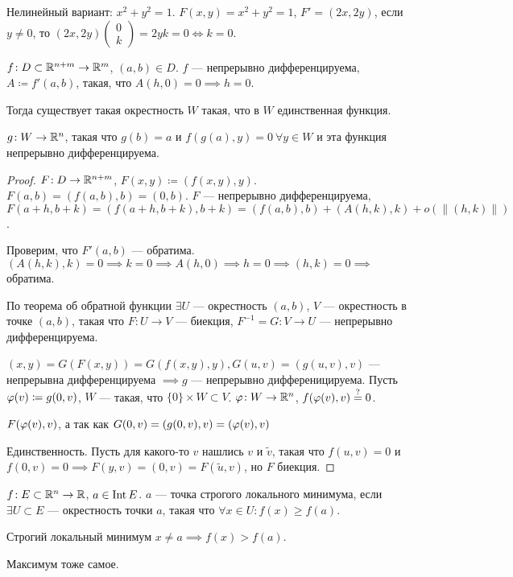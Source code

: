 Нелинейный вариант: $x^2 + y^2 = 1$.  $F(x, y) = x^2+y^2=1$,  $F'=(2x,2y)$, если  $y \neq 0$, то $(2x,2y) \begin{pmatrix} 0 \\ k \end{pmatrix}  = 2yk = 0 \iff k = 0$.
\begin{theorem}
    $f\!: D \subset \mathbb{R}^{n+m} \to \mathbb{R}^m$,  $(a, b) \in D$.  $f$ --- непрерывно дифференцируема,  $A \coloneqq f'(a, b)$, такая, что  $A(h, 0) = 0 \implies h = 0$.

    Тогда существует такая окрестность $W$ такая, что в  $W$ единственная функция.

     $g\!: W \to \mathbb{R}^n$, такая что  $g(b) = a$ и  $f(g(a), y) = 0\ \forall y \in W$ и эта функция непрерывно дифференцируема. 
\end{theorem}
\begin{proof}
    $F\!: D \to \mathbb{R}^{n+m}$,  $F(x, y) \coloneqq (f(x, y), y)$.  $F(a, b) = (f(a, b), b) = (0, b)$.  $F$ --- непрерывно дифференцируема,  $F(a+h, b+k) = (f(a+h, b+k), b+k) = (f(a, b), b) + (A(h, k), k) + o(\|(h, k)\|)$.

    Проверим, что $F'(a, b)$ --- обратима.  $(A(h, k), k) = 0 \implies k = 0 \implies A(h, 0) \implies h = 0 \implies (h, k) = 0 \implies$ обратима.

    По теорема об обратной функции  $\exists U$ --- окрестность  $(a, b)$,  $V$ --- окрестность в точке  $(a, b)$, такая что  $F\!: U \to V$ --- биекция,  $F^{-1} = G\!: V \to U$ --- непрерывно дифференцируема.

    $(x, y) = G(F(x, y)) = G(f(x, y), y), G(u, v) = (g(u, v), v)$ --- непрерывна дифференцируема $\implies g$ --- непрерывно дифференицируема. Пусть  $\varphi(v) \coloneqq g(0, v)$,  $W$ --- такая, что  $\{0\}\times W \subset V$.  $\varphi\!: W \to \mathbb{R}^n$,  $f(\varphi(v), v) \overset{?}{=} 0$. 

     $F(\varphi(v), v)$, а так как  $G(0, v) = (g(0, v), v) = (\varphi(v), v)$

     Единственность. Пусть для какого-то $v$ нашлись  $v$ и  $\widetilde{v}$, такая что  $f(u, v) = 0$ и  $f(0, v) = 0 \implies F(y, v) = (0, v) = F(\widetilde{u}, v)$, но  $F$ биекция.
\end{proof}
\begin{definition}
    $f\!: E \subset \mathbb{R}^n \to \mathbb{R}$,  $a \in \operatorname{Int} E$.  $a$ --- точка строгого локального минимума, если  $\exists U \subset E$ --- окрестность точки  $a$, такая что  $\forall x \in U\!: f(x) \ge f(a)$.

    Строгий локальный минимум $x \neq a \implies f(x) > f(a)$.

    Максимум тоже самое.
\end{definition}
